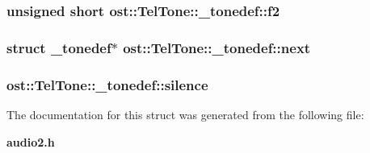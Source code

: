\subsubsection[{f2}]{\setlength{\rightskip}{0pt plus 5cm}unsigned short {\bf ost::TelTone::\_\-tonedef::f2}}\label{structost_1_1_tel_tone_1_1__tonedef_a8bd4411cae9b6fb55a4e74b913fa4b77}
\subsubsection[{next}]{\setlength{\rightskip}{0pt plus 5cm}struct {\bf \_\-tonedef}$\ast$ {\bf ost::TelTone::\_\-tonedef::next}\hspace{0.3cm}{\ttfamily  [read]}}\label{structost_1_1_tel_tone_1_1__tonedef_a6ab75bcf761e4c1a3e5e6574dda3bdd7}
\subsubsection[{silence}]{ {\bf ost::TelTone::\_\-tonedef::silence}}\label{structost_1_1_tel_tone_1_1__tonedef_a34adf3eaef83e30954e5fad4e2be2277}


The documentation for this struct was generated from the following file:\begin{DoxyCompactItemize}
\item 
{\bf audio2.h}\end{DoxyCompactItemize}
